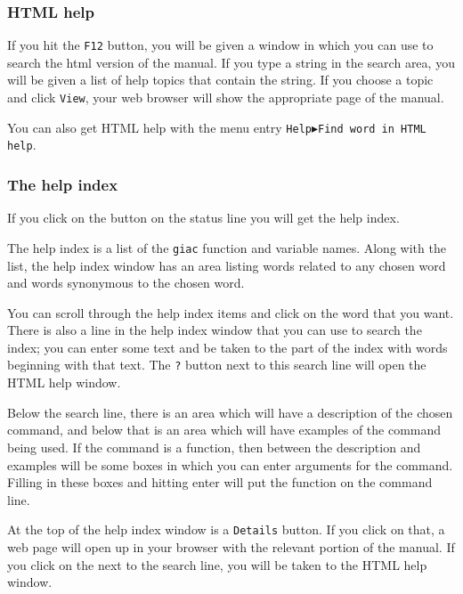 \documentclass[a4paper,11pt]{book}
\begin{document}
\subsubsection{HTML help}

If you hit the \texttt{F12} button, you will be given a window in
which you can use to search the html version of the manual.  If you
type a string in the search area, you will be given a list of help
topics that contain the string.  If you choose a topic and click
\texttt{View}, your web browser will show the appropriate page of 
the manual.

You can also get HTML help with the menu entry
\texttt{Help$\blacktriangleright$Find word in HTML help}.

\subsubsection{The help index}
\label{sssec:helpind}


If you click on the  button on the status line you will
get the help index.

The help index is a list of the \texttt{giac} function and variable
names.  Along with the list, the help index window has an area listing
words related to any chosen word and words synonymous to the chosen word.

You can scroll through the help index items and click on the word that
you want.  There is also a line in the help index window that you can
use to search the index; you can enter some text and be taken to the
part of the index with words beginning with that text.  The \texttt{?}
button next to this search line will open the HTML help window.

Below the search line, there is an area which will have a description
of the chosen command, and below that is an area which will have
examples of the command being used.  If the command is a function,
then between the description and examples will be some boxes in which
you can enter arguments for the command.  Filling in these boxes and
hitting enter will put the function on the command line.

At the top of the help index window is a \texttt{Details} button.  If
you click on that, a web page will open up in your browser with the
relevant portion of the manual. If you click on the
 next to the search line, you will be taken to
the HTML help window.
\end{document}
